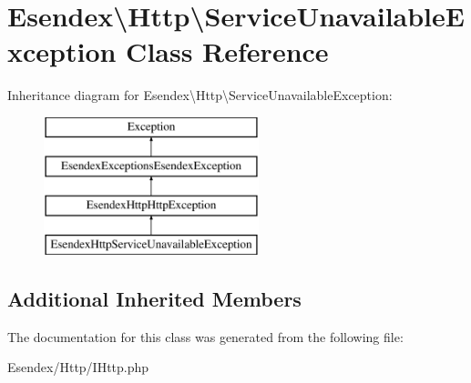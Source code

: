 \section{Esendex\textbackslash{}Http\textbackslash{}Service\-Unavailable\-Exception Class Reference}
\label{class_esendex_1_1_http_1_1_service_unavailable_exception}
Inheritance diagram for Esendex\textbackslash{}Http\textbackslash{}Service\-Unavailable\-Exception\-:\begin{figure}[H]
\begin{center}
\leavevmode
\includegraphics[height=4.000000cm]{class_esendex_1_1_http_1_1_service_unavailable_exception}
\end{center}
\end{figure}
\subsection*{Additional Inherited Members}


The documentation for this class was generated from the following file\-:\begin{DoxyCompactItemize}
\item 
Esendex/\-Http/I\-Http.\-php\end{DoxyCompactItemize}
